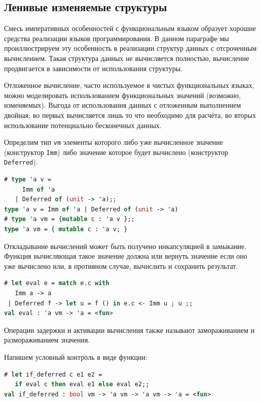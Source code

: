 \subsection{Ленивые изменяемые структуры}
\label{subsec:lazy_modifiable_data_structures}

Смесь императивных особенностей с функциональным языком образует хорошие
средства реализации языков программирования. В данном параграфе мы
проиллюстрируем эту особенность в реализации структур данных с отсроченным
вычислением. Такая структура данных не вычисляется полностью, вычисление
продвигается в зависимости от использования структуры.

Отложенное вычисление, часто используемое в чистых функциональных языках, можно
моделировать использованием функциональных значений (возможно, изменяемых).
Выгода от использования данных с отложенным выполнением двойная; во первых
вычисляется лишь то что необходимо для расчёта, во вторых использование
потенциально бесконечных данных.

Определим тип \texttt{vm} элементы которого либо уже вычисленное значение
(конструктор \texttt{Imm}) либо значение которое будет вычислено (конструктор
\texttt{Deferred}).

\begin{lstlisting}[language=OCaml]
# type 'a v =
     Imm of 'a
   | Deferred of (unit -> 'a);;
type 'a v = Imm of 'a | Deferred of (unit -> 'a)
# type 'a vm = {mutable c : 'a v };;
type 'a vm = { mutable c : 'a v; }
\end{lstlisting}

Откладывание вычислений может быть получено инкапсуляцией в замыкание. Функция
вычисляющая такое значение должна или вернуть значение если оно уже вычислено
или, в противном случае, вычислить и сохранить результат.

\begin{lstlisting}[language=OCaml]
# let eval e = match e.c with
   Imm a -> a
 | Deferred f -> let u = f () in e.c <- Imm u ; u ;;
val eval : 'a vm -> 'a = <fun>
\end{lstlisting}

Операции задержки и активации вычисления также называют замораживанием и
размораживанием значения.

Напишем условный контроль в виде функции:

\begin{lstlisting}[language=OCaml]
# let if_deferred c e1 e2 =
   if eval c then eval e1 else eval e2;;
val if_deferred : bool vm -> 'a vm -> 'a vm -> 'a = <fun>
\end{lstlisting}

